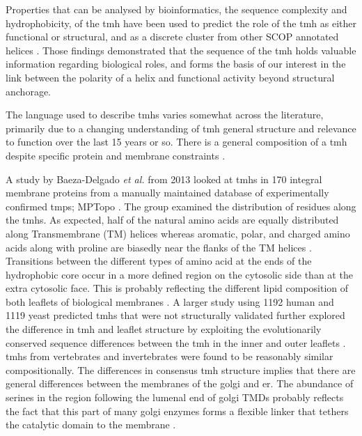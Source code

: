 

Properties that can be analysed by bioinformatics, the sequence complexity and hydrophobicity, of the \gls{tmh} have been used to predict the role of the \gls{tmh} as either functional or structural, and as a discrete cluster from other SCOP annotated helices \cite{Wong2012}. Those findings demonstrated that the sequence of the \gls{tmh} holds valuable information regarding biological roles, and forms the basis of our interest in the link between the polarity of a helix and functional activity beyond structural anchorage.

The language used to describe \gls{tmh}s varies somewhat across the literature, primarily due to a changing understanding of \gls{tmh} general structure and relevance to function over the last 15 years or so. There is a general composition of a \gls{tmh} despite specific protein and membrane constraints \cite{Sharpe2010}.

A study by Baeza-Delgado {\it et al.} from 2013 \cite{Baeza-Delgado2013} looked at \gls{tmh}s in 170 integral membrane proteins from a manually maintained database of experimentally confirmed \gls{tmp}s; MPTopo \cite{Jayasinghe2001}. The group examined the distribution of residues along the \gls{tmh}s. As expected, half of the natural amino acids are equally distributed along Transmembrane (TM) helices whereas aromatic, polar, and charged amino acids along with proline are biasedly near the flanks of the TM helices \cite{Baeza-Delgado2013}. Transitions between the different types of amino acid at the ends of the hydrophobic core occur in a more defined region on the cytosolic side than at the extra cytosolic face. This is probably reflecting the different lipid composition of both leaflets of biological membranes \cite{Baeza-Delgado2013}. A larger study using 1192 human and 1119 yeast predicted \gls{tmh}s that were not structurally validated further explored the difference in \gls{tmh} and leaflet structure by exploiting the evolutionarily conserved sequence differences between the \gls{tmh} in the inner and outer leaflets \cite{Sharpe2010}. \gls{tmh}s from vertebrates and invertebrates were found to be reasonably similar compositionally. The differences in consensus \gls{tmh} structure implies that there are general differences between the membranes of the golgi and \gls{er}. The abundance of serines in the region following the lumenal end of golgi TMDs probably reflects the fact that this part of many golgi enzymes forms a flexible linker that tethers the catalytic domain to the membrane \cite{Sharpe2010}.

